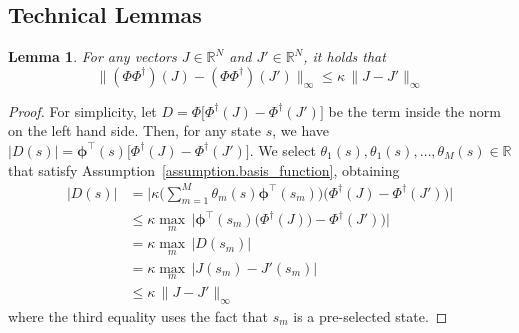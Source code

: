 \documentclass[11pt, notitlepage]{article}
\newcommand{\R}{\mathbb{R}}
\newcommand{\1}{\mathbbm{1}}
\newtheorem{lemma}{Lemma}[section]
\begin{document}
\subsection{Technical Lemmas}
\begin{lemma} \label{lemma.Phi_Phi_dagger}
    For any vectors $J \in \mathbb{R}^N$ and $J' \in \mathbb{R}^N$, it holds that
    \begin{equation*}
        \bigl \| (\Phi \Phi^\dagger)(J) - (\Phi \Phi^\dagger)(J') \bigr \|_\infty \le \kappa \, \| J - J' \|_\infty %
    \end{equation*}
\end{lemma}
\begin{proof}
For simplicity, let $D = \Phi \bigl[ \Phi^\dagger(J) - \Phi^\dagger(J')\bigr]$ be the term inside the norm on the left hand side. Then, for any state $s$, we have $|D(s)| = \boldsymbol{\phi}^\intercal(s) \bigl[ \Phi^\dagger(J) - \Phi^\dagger(J')\bigr]$.
    We select $\theta_1(s), \theta_1(s), \ldots, \theta_M(s) \in \R$ that satisfy Assumption~\ref{assumption.basis_function}, obtaining
    \begin{align*}
        |D(s)| &= \Biggl| \kappa \Biggl( \sum_{m=1}^M \theta_m(s) \boldsymbol{\phi}^\intercal(s_m) \Biggr) \bigl(\Phi^\dagger(J) - \Phi^\dagger(J')\bigr) \Biggr| \\
        &\leq \kappa \max_m \, \bigl| \boldsymbol{\phi}^\intercal(s_m) \bigl(\Phi^\dagger(J)) - \Phi^\dagger(J')\bigr) \bigr| \\
        &= \kappa \max_m  \, |D(s_m)| \\
        &= \kappa \max_m \, |J(s_m) - J'(s_m)| \\
        &\leq \kappa \, \| J - J' \|_\infty %
    \end{align*}
    where the third equality uses the fact that $s_m$ is a pre-selected state.
\end{proof}
\end{document}
